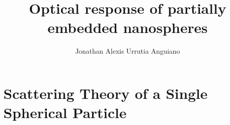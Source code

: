 \documentclass[11pt]{Latex/Classes/PhDthesisPSnPDF}
\author{Jonathan Alexis Urrutia Anguiano}
\title{Optical response of partially embedded nanospheres}
\begin{document}
%
\maketitle
\frontmatter


%



%
\setcounter{secnumdepth}{3} %
\setcounter{tocdepth}{3}    %
 
\tableofcontents            %


\mainmatter

\def\baselinestretch{1}                   %



\chapter{Scattering Theory of a Single Spherical Particle}
  \label{ch:OpticalProperties}
\end{document}
